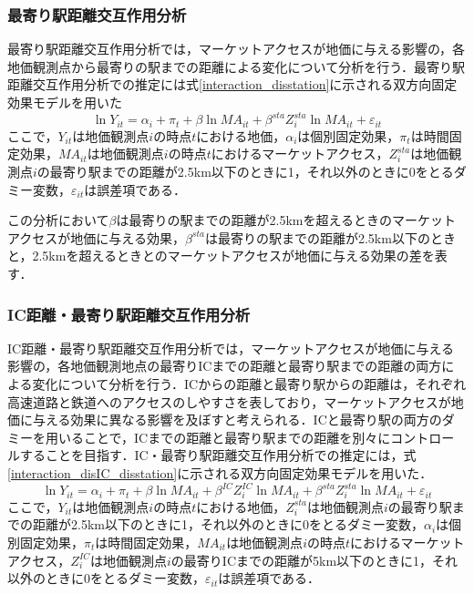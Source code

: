 \subsubsection{最寄り駅距離交互作用分析}
最寄り駅距離交互作用分析では，マーケットアクセスが地価に与える影響の，各地価観測点から最寄りの駅までの距離による変化について分析を行う．最寄り駅距離交互作用分析での推定には式\ref{interaction_disstation}に示される双方向固定効果モデルを用いた
\begin{equation}
  \ln{Y_{it}} = \alpha_{i} + \pi_{t} + \beta\ln{MA_{it}} + \beta^{sta}Z^{sta}_{i}\ln{MA_{it}} + \varepsilon_{it}
  \label{interaction_disstation}
\end{equation}
ここで，$Y_{it}$は地価観測点$i$の時点$t$における地価，$\alpha_{i}$は個別固定効果，$\pi_{t}$は時間固定効果，$MA_{it}$は地価観測点$i$の時点$t$におけるマーケットアクセス，$Z^{sta}_{i}$は地価観測点$i$の最寄り駅までの距離が2.5km以下のときに1，それ以外のときに0をとるダミー変数，$\varepsilon_{it}$は誤差項である．

この分析において$\beta$は最寄りの駅までの距離が2.5kmを超えるときのマーケットアクセスが地価に与える効果，$\beta^{sta}$は最寄りの駅までの距離が2.5km以下のときと，2.5kmを超えるときとのマーケットアクセスが地価に与える効果の差を表す．
\subsubsection{IC距離・最寄り駅距離交互作用分析}
IC距離・最寄り駅距離交互作用分析では，マーケットアクセスが地価に与える影響の，各地価観測地点の最寄りICまでの距離と最寄り駅までの距離の両方による変化について分析を行う．ICからの距離と最寄り駅からの距離は，それぞれ高速道路と鉄道へのアクセスのしやすさを表しており，マーケットアクセスが地価に与える効果に異なる影響を及ぼすと考えられる．ICと最寄り駅の両方のダミーを用いることで，ICまでの距離と最寄り駅までの距離を別々にコントロールすることを目指す．IC・最寄り駅距離交互作用分析での推定には，式\ref{interaction_disIC_disstation}に示される双方向固定効果モデルを用いた．
\begin{equation}
  \ln{Y_{it}} = \alpha_{i} + \pi_{t} + \beta\ln{MA_{it}} + \beta^{IC}Z^{IC}_{i}\ln{MA_{it}} + \beta^{sta}Z^{sta}_{i}\ln{MA_{it}} + \varepsilon_{it}
  \label{interaction_disIC_disstation}
\end{equation}
ここで，$Y_{it}$は地価観測点$i$の時点$t$における地価，$Z^{sta}_{i}$は地価観測点$i$の最寄り駅までの距離が2.5km以下のときに1，それ以外のときに0をとるダミー変数，$\alpha_{i}$は個別固定効果，$\pi_{t}$は時間固定効果，$MA_{it}$は地価観測点$i$の時点$t$におけるマーケットアクセス，$Z^{IC}_{i}$は地価観測点$i$の最寄りICまでの距離が5km以下のときに1，それ以外のときに0をとるダミー変数，$\varepsilon_{it}$は誤差項である．

